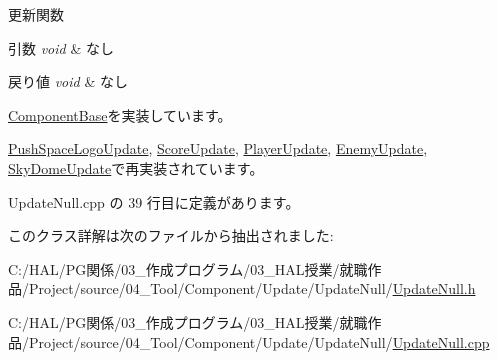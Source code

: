 更新関数 


\begin{DoxyParams}{引数}
{\em void} & なし \\
\hline
\end{DoxyParams}

\begin{DoxyRetVals}{戻り値}
{\em void} & なし \\
\hline
\end{DoxyRetVals}


\mbox{\hyperlink{class_component_base_a58e66d65bc8f3cd5ab67b4b2deab4fc2}{Component\+Base}}を実装しています。



\mbox{\hyperlink{class_push_space_logo_update_aa07fe6f6f4f072e1f81bc6708dd4727e}{Push\+Space\+Logo\+Update}}, \mbox{\hyperlink{class_score_update_aae2b398784079a651ed92eb4c634b1c9}{Score\+Update}}, \mbox{\hyperlink{class_player_update_af6e1b8ca60399f232e64d2acb4968c75}{Player\+Update}}, \mbox{\hyperlink{class_enemy_update_ae9662f3a2d064dc69c0d68293e60f051}{Enemy\+Update}}, \mbox{\hyperlink{class_sky_dome_update_ae163cb90e4de561fe1f7b2cb311be331}{Sky\+Dome\+Update}}で再実装されています。



 Update\+Null.\+cpp の 39 行目に定義があります。



このクラス詳解は次のファイルから抽出されました\+:\begin{DoxyCompactItemize}
\item 
C\+:/\+H\+A\+L/\+P\+G関係/03\+\_\+作成プログラム/03\+\_\+\+H\+A\+L授業/就職作品/\+Project/source/04\+\_\+\+Tool/\+Component/\+Update/\+Update\+Null/\mbox{\hyperlink{_update_null_8h}{Update\+Null.\+h}}\item 
C\+:/\+H\+A\+L/\+P\+G関係/03\+\_\+作成プログラム/03\+\_\+\+H\+A\+L授業/就職作品/\+Project/source/04\+\_\+\+Tool/\+Component/\+Update/\+Update\+Null/\mbox{\hyperlink{_update_null_8cpp}{Update\+Null.\+cpp}}\end{DoxyCompactItemize}
